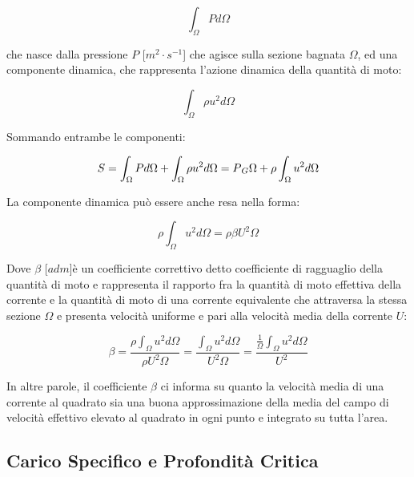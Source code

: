 \documentclass[12pt]{article} %
\begin{document}
\begin{equation}
   \int_{\Omega}^{} Pd\Omega
   \label{eqn:S_comp_statica}
\end{equation}

\noindent che nasce dalla pressione $P$ [$m^2\cdot s^{-1}$] che agisce sulla sezione bagnata $\Omega$, ed una componente dinamica, che rappresenta l’azione dinamica della quantità di moto:

\begin{equation}
   \int_{\Omega}^{} \rho u^{2}d\Omega
   \label{eqn:S_comp_dinamica}
\end{equation}

\noindent Sommando entrambe le componenti:   

\begin{equation}
   S=\int_{\Omega}^{} Pd\Omega+\int_{\Omega}^{} \rho u^{2}d\Omega=P\textsubscript{$G$}\Omega+\rho\int_{\Omega}^{} u^{2}d\Omega
   \label{eqn:S}
\end{equation}

\noindent La componente dinamica può essere anche resa nella forma:

\begin{equation}
    \rho\int_{\Omega}^{} u^{2}d\Omega=\rho\beta U^{2}\Omega
    \label{eqn:comp_dinamica_beta}
\end{equation}

\noindent Dove $\beta$ [$adm$]è un coefficiente correttivo detto coefficiente di ragguaglio della quantità di moto e rappresenta il rapporto fra la quantità di moto effettiva della corrente e la quantità di moto di una corrente equivalente che attraversa la stessa sezione $\Omega$ e presenta velocità uniforme e pari alla velocità media della corrente $U$: 

\begin{equation}
   \beta=\frac{\rho \int_{\Omega}^{} u^{2}d\Omega}{\rho U^{2}\Omega}=\frac{\int_{\Omega}^{} u^{2}d\Omega}{U^{2}\Omega}=\frac{\frac{1}{\Omega}\int_{\Omega}^{} u^{2}d\Omega}{U^{2}}
   \label{eqn:beta}
\end{equation}

\noindent In altre parole, il coefficiente $\beta$ ci informa su quanto la velocità media di una corrente al quadrato sia una buona approssimazione della media del campo di velocità effettivo elevato al quadrato in ogni punto e integrato su tutta l’area.

\subsection{Carico Specifico e Profondità Critica}
\end{document}
